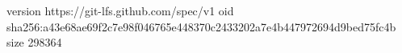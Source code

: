 version https://git-lfs.github.com/spec/v1
oid sha256:a43e68ae69f2c7e98f046765e448370c2433202a7e4b447972694d9bed75fc4b
size 298364
